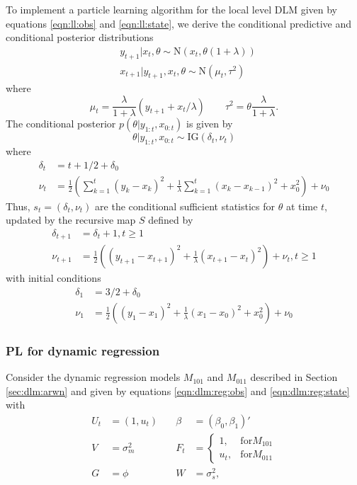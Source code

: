 To implement a particle learning algorithm for the local level DLM given by equations \eqref{eqn:ll:obs} and \eqref{eqn:ll:state}, we derive the conditional predictive and conditional posterior distributions
\begin{align}
&y_{t+1}|x_t,\theta \sim \mbox{N}\left(x_t,\theta(1+\lambda)\right) \label{eqn:pl:ll:pred} \\
&x_{t+1}|y_{t+1},x_t,\theta \sim \mbox{N}(\mu_t,\tau^2) \label{eqn:pl:ll:state}
\end{align}
where \[\mu_t = \frac{\lambda}{1+\lambda}(y_{t+1} + x_t / \lambda) \qquad \tau^2 = \theta\frac{\lambda}{1+\lambda}.\]
The conditional posterior $p(\theta|y_{1:t},x_{0:t})$ is given by
\begin{equation}
\theta|y_{1:t},x_{0:t} \sim \mbox{IG}(\delta_t,\nu_t)
\end{equation}
where
\begin{align*}
\delta_t &= t + 1/2 + \delta_0 \\
\nu_t &= \frac{1}{2}\left(\sum_{k=1}^t (y_k - x_k)^2 + \frac{1}{\lambda}\sum_{k=1}^t (x_k - x_{k-1})^2 + x_0^2\right) + \nu_0
\end{align*}
Thus, $s_t = (\delta_t,\nu_t)$ are the conditional sufficient statistics for $\theta$ at time $t$, updated by the recursive map $S$ defined by
\begin{align}
\delta_{t+1} &= \delta_t + 1, t \ge 1 \label{eqn:pl:ll:delta} \\
\nu_{t+1} &= \frac{1}{2}\left((y_{t+1}-x_{t+1})^2 + \frac{1}{\lambda}(x_{t+1}-x_t)^2\right) + \nu_t, t \ge 1 \label{eqn:pl:ll:nu}
\end{align}
with initial conditions
\begin{align*}
\delta_1 &= 3/2 + \delta_0 \\
\nu_1 &= \frac{1}{2}\left((y_1-x_1)^2 + \frac{1}{\lambda}(x_1-x_0)^2 + x_0^2\right) + \nu_0
\end{align*}

\subsubsection{PL for dynamic regression}

Consider the dynamic regression models $M_{101}$ and $M_{011}$ described in Section \ref{sec:dlm:arwn} and given by equations \eqref{eqn:dlm:reg:obs} and \eqref{eqn:dlm:reg:state} with
\begin{align*}
U_t &= (1, u_t) &\quad \beta &= (\beta_0, \beta_1)' \\
V &= \sigma^2_m &\quad F_t &= \left\{\begin{array}{ll} 1, & \mbox{for} M_{101} \\ u_t, & \mbox{for} M_{011} \end{array}\right. \\
G &= \phi &\quad W &= \sigma^2_s,
\end{align*}

